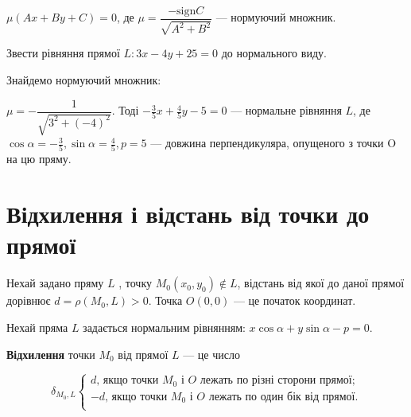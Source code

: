 $\mu(Ax+By+C) = 0$, де $\mu = \dfrac{-\text{sign} C}{\sqrt{A^2 + B^2}}$ --- нормуючий множник.

\begin{example}
	Звести рівняння прямої $L : 3x-4y+25 = 0$ до нормального виду.
\end{example}
\begin{solution}
	Знайдемо нормуючий множник:

	$\mu = -\dfrac{1}{\sqrt{3^2 + (-4)^2}}$.
	Тоді $-\frac{3}{5} x + \frac{4}{5} y - 5 = 0$ --- нормальне рівняння $L$, де
	$\cos\alpha = -\frac{3}{5}, \sin\alpha = \frac{4}{5}, p = 5$ --- довжина перпендикуляра,
	опущеного з точки O на цю пряму. 
\end{solution}

\section{Відхилення і відстань від точки до прямої}

\parbox{4.5cm}{}
\parbox{\textwidth - 4.6cm}{
	Нехай задано пряму $L$ , точку $M_0(x_0,y_0)\not\in L$,
	відстань від якої до даної прямої дорівнює
	$d = \rho(M_0, L) > 0$. Точка $O(0,0)$ --- це
	початок координат.

	Нехай пряма $L$ задається нормальним
	рівнянням: $x\cos\alpha + y\sin\alpha - p = 0$.
}

\begin{definition}
	\textbf{Відхилення} точки $M_0$ від прямої $L$ --- це число

	$$\delta_{M_0,L}\left\{\begin{array}{l}
		d\text{, якщо точки } M_0 \text{ і } O \text{ лежать по різні сторони прямої;} \\
		-d\text{, якщо точки } M_0 \text{ і } O \text{ лежать по один бік від прямої.} \\
	\end{array}\right.$$
\end{definition}


